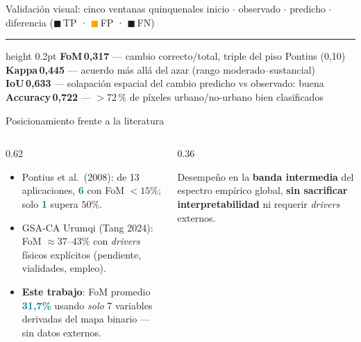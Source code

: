 \documentclass[aspectratio=169,11pt]{beamer}
\newcommand{\highlight}[1]{\textcolor{UNAMBlue}{\textbf{#1}}}
\newcommand{\keynum}[1]{\textcolor{Teal}{\textbf{#1}}}
\begin{document}
\begin{frame}[shrink=5]{Validación visual: cinco ventanas quinquenales}
{\tiny\color{Slate}\centering
 inicio $\cdot$ observado $\cdot$ predicho $\cdot$ diferencia\;
 (\textcolor{GreenOK}{$\blacksquare$}\,TP · \textcolor{orange}{$\blacksquare$}\,FP · \textcolor{Steel}{$\blacksquare$}\,FN)}
\vspace{0.05cm}
\hrule height 0.2pt\color{gray!20}
\vspace{0.04cm}
{\tiny\color{black}\centering
  \textbf{\textcolor{UNAMBlue}{FoM\,0,317}} — cambio correcto/total, triple del piso Pontius (0,10)\quad
  \textbf{\textcolor{UNAMBlue}{Kappa\,0,445}} — acuerdo más allá del azar (rango moderado–sustancial)\\[1pt]
  \textbf{\textcolor{UNAMBlue}{IoU\,0,633}} — solapación espacial del cambio predicho vs observado: buena\quad
  \textbf{\textcolor{UNAMBlue}{Accuracy\,0,722}} — $>$72\,\% de píxeles urbano/no-urbano bien clasificados
}
\end{frame}

\begin{frame}{Posicionamiento frente a la literatura}
\begin{columns}[T]
  \begin{column}{0.62\textwidth}
    \small
    \begin{itemize}
      \item \textcolor{Slate}{Pontius et al.\ (2008)}: de 13 aplicaciones, \keynum{6} con FoM $<15\%$; solo \keynum{1} supera $50\%$.
      \item \textcolor{Slate}{GSA-CA Urumqi (Tang 2024)}: FoM $\approx 37$--$43\%$ con \emph{drivers} físicos explícitos (pendiente, vialidades, empleo).
      \item \highlight{Este trabajo}: FoM promedio \keynum{31{,}7\%} usando \emph{solo} 7 variables derivadas del mapa binario — sin datos externos.
    \end{itemize}
  \end{column}
  \begin{column}{0.36\textwidth}
    \begin{block}{}
      \centering\footnotesize Desempeño en la \highlight{banda intermedia} del espectro empírico global, \textbf{sin sacrificar interpretabilidad} ni requerir \emph{drivers} externos.
    \end{block}
  \end{column}
\end{columns}
\end{frame}
\end{document}

